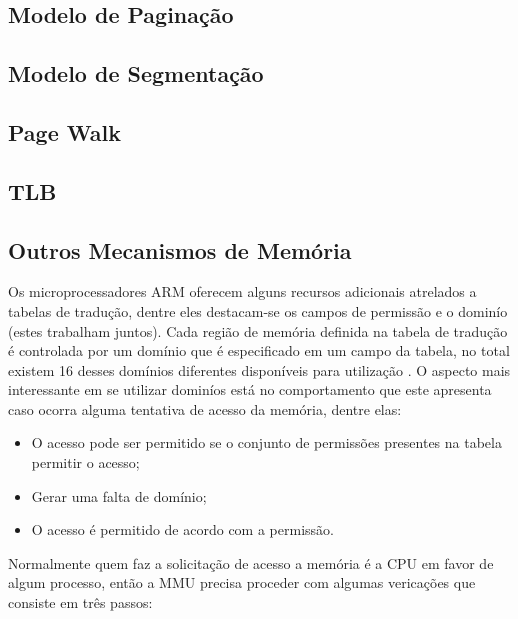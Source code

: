 \subsection{Modelo de Paginação}

\subsection{Modelo de Segmentação}

\subsection{Page Walk}

\subsection{TLB}

\subsection{Outros Mecanismos de Memória}
\label{sec:outros_mecanismos_memoria}

Os microprocessadores ARM oferecem alguns recursos adicionais atrelados a
tabelas de tradução, dentre eles destacam-se os campos de permissão e o dominío
(estes trabalham juntos). Cada região de memória definida na tabela de tradução
é controlada por um domínio que é especificado em um campo da tabela, no total
existem 16 desses domínios diferentes disponíveis para utilização
\cite{armdeveloperguide}. O aspecto mais interessante em se utilizar dominíos
está no comportamento que este apresenta caso ocorra alguma tentativa de acesso
da memória, dentre elas:

\begin{itemize}
  \item O acesso pode ser permitido se o conjunto de permissões presentes na
        tabela permitir o acesso;
  \item Gerar uma falta de domínio;
  \item O acesso é permitido de acordo com a permissão.
\end{itemize}

Normalmente quem faz a solicitação de acesso a memória é a CPU em favor de
algum processo, então a MMU precisa proceder com algumas vericações que
consiste em três passos:

